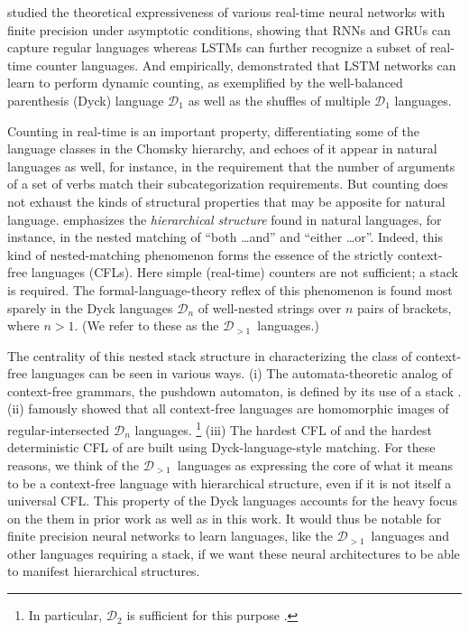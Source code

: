\documentclass[11pt,a4paper]{article}
\theoremstyle{plain}
\newcommand{\dyck}[1]{\ensuremath{\mathcal{D}_{#1}}}
\newcommand{\gendyck}{\dyck{>1}}
\begin{document}
\citet{merrill2019sequential} studied the theoretical expressiveness of various real-time neural networks with finite precision under asymptotic conditions, showing that RNNs and GRUs can capture regular languages whereas LSTMs can further recognize a subset of real-time counter languages. And empirically, \citet{suzgun-etal-2019-lstm} demonstrated that LSTM networks can learn to perform dynamic counting, as exemplified by the well-balanced parenthesis (Dyck) language \dyck{1} as well as the shuffles of multiple \dyck{1} languages.

{Counting} in real-time is an important property, differentiating some of the language classes in the Chomsky hierarchy, and echoes of it appear in natural languages as well, for instance, in the requirement that the number of arguments of a set of verbs match their subcategorization requirements. But counting does not exhaust the kinds of structural properties that may be apposite for natural language. \citet{Chomsky1957} emphasizes the \emph{hierarchical structure} found in natural languages, for instance, in the nested matching of ``both \ldots and'' and ``either \ldots or''. Indeed, this kind of nested-matching phenomenon forms the essence of the strictly context-free languages (CFLs). Here simple (real-time) counters are not sufficient; a stack is required. The formal-language-theory reflex of this phenomenon is found most sparely in the Dyck languages \dyck{n} of well-nested strings over $n$ pairs of brackets, where $n > 1$. (We refer to these as the \gendyck\ languages.)

The centrality of this nested stack structure in characterizing the class of context-free languages can be seen in various ways. (i) The automata-theoretic analog of context-free grammars, the pushdown automaton, is defined by its use of a stack \citep{chomsky1962context}. (ii) \citet{chomsky1963algebraic} famously showed that all context-free languages are homomorphic images of regular-intersected \dyck{n} languages.%
%
\footnote{In particular, \dyck{2} is sufficient for this purpose \citep{magniez2014recognizing, suzgun-etal-2019-lstm}.}
%
(iii) The hardest CFL of \citet{greibach1973hardest} and the hardest deterministic CFL of \citet{sudborough1976deterministic} are built using Dyck-language-style matching.
For these reasons, we think of the \gendyck\ languages as expressing the core of what it means to be a context-free language with hierarchical structure, even if it is not itself a universal CFL.
This property of the Dyck languages  accounts for the heavy focus on the them in prior work \citep{deleu2016learning, bernardy2018can,sennhauser2018evaluating, skachkova2018closing, hao2018context, zaremba2016learning, suzgun2019evaluating, yu-etal-2019-learning, hahn2019theoretical} as well as in this work. It would thus be notable for finite precision neural networks to learn languages, like the \gendyck\ languages and other languages requiring a stack, if we want these neural architectures to be able to manifest hierarchical structures.
\end{document}
